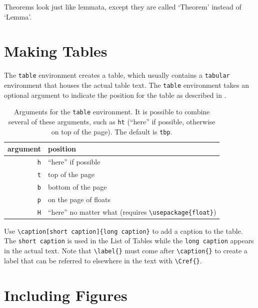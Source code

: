 \begin{theorem}
\label{thm:example}
Theorems look just like lemmata, except they are called `Theorem' instead of `Lemma'.
\end{theorem}

\section{Making Tables} %

The \verb"table" environment creates a table, which usually contains a \verb"tabular" environment that houses the actual table text.
The \verb"table" environment takes an optional argument to indicate the position for the table as described in .
%
%


\begin{table}[ht]
\centering
\begin{tabular}{r|l}
    argument & position
    \\ \hline
    \texttt{h} & ``here'' if possible \\
    \texttt{t} & top of the page \\
    \texttt{b} & bottom of the page \\
    \texttt{p} & on the page of floats \\
    \texttt{H} & ``here'' no matter what (requires \verb"\usepackage{float}")
\end{tabular}
\caption[Arguments for the \texttt{table} environment.]{
    Arguments for the \texttt{table} environment. It is possible to combine several of these arguments, such as \texttt{ht} (``here'' if possible, otherwise on top of the page). The default is \texttt{tbp}.
}
\label{table:positions}
\end{table}

Use \verb"\caption[short caption]{long caption}" to add a caption to the table.
The \texttt{short caption} is used in the List of Tables
%
while the \texttt{long caption} appears in the actual text.
Note that \verb"\label{}" must come after \verb"\caption{}" to create a label that can be referred to elsewhere in the text with \verb"\Cref{}".

\section{Including Figures} %

